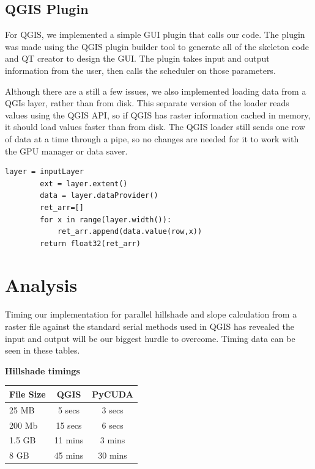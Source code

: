 \documentclass[journal]{IEEEtran}
\begin{document}
    \subsection{QGIS Plugin}
    For QGIS, we implemented a simple GUI plugin that calls our code. The plugin
    was made using the QGIS plugin builder tool to generate all of the skeleton
    code and QT creator to design the GUI. The plugin takes input and output
    information from the user, then calls the scheduler on those parameters.

    Although there are a still a few issues, we also implemented loading data
    from a QGIs layer, rather than from disk. This separate version of the loader
    reads values using the QGIS API, so if QGIS has raster information cached in
    memory, it should load values faster than from disk. The QGIS loader still
    sends one row of data at a time through a pipe, so no changes are needed
    for it to work with the GPU manager or data saver.

\begin{Verbatim}[frame=single, gobble=7]
        layer = inputLayer
        ext = layer.extent()
        data = layer.dataProvider()
        ret_arr=[]
        for x in range(layer.width()):
            ret_arr.append(data.value(row,x))
        return float32(ret_arr)
\end{Verbatim}
    
\section{Analysis}
Timing our implementation for parallel hillshade and slope calculation from a raster file
against the standard serial methods used in QGIS has revealed the input and
output will be our biggest hurdle to overcome. Timing data can be seen in these
tables.

\vspace{.25in}
\pagebreak
\textbf{Hillshade timings}
\vspace{0.05in}

\begin{tabular}{ l | c | c }
    File Size & QGIS   & PyCUDA\\ \hline
    25 MB     & 5 secs & 3 secs\\ \hline
    200 Mb    & 15 secs & 6 secs\\ \hline
    1.5 GB    & 11 mins & 3 mins\\ \hline
    8 GB      & 45 mins & 30 mins
\end {tabular}
\end{document}
